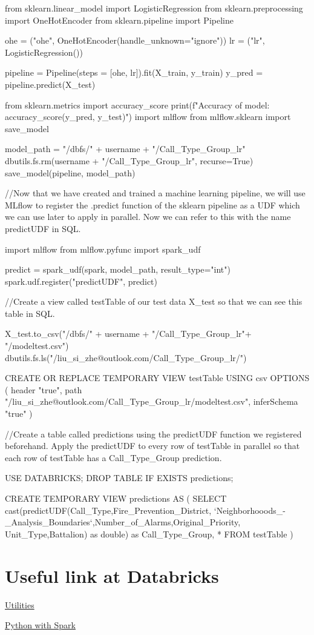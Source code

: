 \documentclass[12pt]{article}
\begin{document}
\begin{code}
from sklearn.linear_model import LogisticRegression
from sklearn.preprocessing import OneHotEncoder
from sklearn.pipeline import Pipeline


ohe = ("ohe", OneHotEncoder(handle_unknown="ignore"))
lr = ("lr", LogisticRegression())

pipeline = Pipeline(steps = [ohe, lr]).fit(X_train, y_train)
y_pred = pipeline.predict(X_test)

from sklearn.metrics import accuracy_score
print(f"Accuracy of model: {accuracy_score(y_pred, y_test)}")
import mlflow
from mlflow.sklearn import save_model

model_path = "/dbfs/" + username + "/Call_Type_Group_lr"
dbutils.fs.rm(username + "/Call_Type_Group_lr", recurse=True)
save_model(pipeline, model_path)

//Now that we have created and trained a machine learning pipeline, we will use MLflow to register the .predict function of the sklearn pipeline as a UDF which we can use later to apply in parallel. Now we can refer to this with the name predictUDF in SQL.

import mlflow
from mlflow.pyfunc import spark_udf

predict = spark_udf(spark, model_path, result_type="int")
spark.udf.register("predictUDF", predict)

//Create a view called testTable of our test data X_test so that we can see this table in SQL.

X_test.to_csv("/dbfs/" + username + "/Call_Type_Group_lr"+ "/modeltest.csv")
dbutils.fs.ls("/liu_si_zhe@outlook.com/Call_Type_Group_lr/")

CREATE OR REPLACE TEMPORARY VIEW testTable
USING csv
OPTIONS (
  header "true",
  path "/liu_si_zhe@outlook.com/Call_Type_Group_lr/modeltest.csv",
  inferSchema "true"
)

//Create a table called predictions using the predictUDF function we registered beforehand. Apply the predictUDF to every row of testTable in parallel so that each row of testTable has a Call_Type_Group prediction.

USE DATABRICKS;
DROP TABLE IF EXISTS predictions;

CREATE TEMPORARY VIEW predictions AS (
  SELECT cast(predictUDF(Call_Type,Fire_Prevention_District, `Neighborhooods_-_Analysis_Boundaries`,Number_of_Alarms,Original_Priority,
  Unit_Type,Battalion) as double) as Call_Type_Group, *
  FROM testTable
)
\end{code}
   

\section{Useful link at Databricks}
\hyperlink{https://docs.azuredatabricks.net/dev-tools/databricks-utils.html}{Utilities}

\hyperlink{https://kb.azuredatabricks.net/python/index.html}{Python with Spark}
\end{document}
